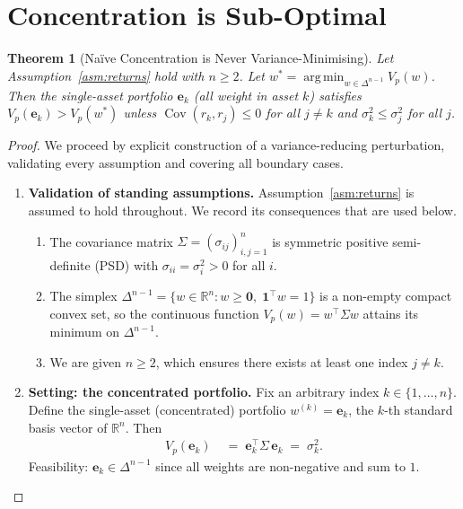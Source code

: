 \documentclass[12pt,openany]{book}
\newcommand{\bfw}{\mathbf{w}}
\newcommand{\bfe}{\mathbf{e}}
\DeclareMathOperator{\Cov}{Cov}
\DeclareMathOperator*{\argmin}{arg\,min}
\numberwithin{equation}{chapter}
\theoremstyle{plain}
\newtheorem{theorem}{Theorem}[chapter]
\theoremstyle{definition}
\theoremstyle{remark}
\def\bfw{w}%
\begin{document}
\section{Concentration is Sub-Optimal}

\begin{theorem}[Na\"{i}ve Concentration is Never Variance-Minimising]
\label{thm:naive-concentration}
Let Assumption~\ref{asm:returns} hold with $n \geq 2$.
Let $\bfw^* = \argmin_{\bfw \in \Delta^{n-1}} V_p(\bfw)$.
Then the single-asset portfolio $\bfe_k$ (all weight in asset $k$)
satisfies $V_p(\bfe_k) > V_p(\bfw^*)$ unless
$\Cov(r_k, r_j) \leq 0$ for all $j \neq k$ and
$\sigma_k^2 \leq \sigma_j^2$ for all $j$.
\end{theorem}

\begin{proof}
We proceed by explicit construction of a variance-reducing perturbation,
validating every assumption and covering all boundary cases.

\begin{enumerate}

  \item \textbf{Validation of standing assumptions.}
        Assumption~\ref{asm:returns} is assumed to hold throughout.
        We record its consequences that are used below.
        \begin{enumerate}
          \item The covariance matrix
                $\Sigma = (\sigma_{ij})_{i,j=1}^{n}$ is
                symmetric positive semi-definite (PSD) with
                $\sigma_{ii} = \sigma_i^2 > 0$ for all $i$.
          \item The simplex $\Delta^{n-1}
                = \{\bfw \in \mathbb{R}^n : \bfw \geq \mathbf{0},\;
                \mathbf{1}^\top\bfw = 1\}$ is a non-empty compact
                convex set, so the continuous function
                $V_p(\bfw) = \bfw^\top \Sigma \bfw$ attains its
                minimum on $\Delta^{n-1}$.
          \item We are given $n \geq 2$, which ensures there
                exists at least one index $j \neq k$.
        \end{enumerate}

  \item \textbf{Setting: the concentrated portfolio.}
        Fix an arbitrary index $k \in \{1,\ldots,n\}$.
        Define the single-asset (concentrated) portfolio
        $\bfw^{(k)} = \bfe_k$, the $k$-th standard basis
        vector of $\mathbb{R}^n$.  Then
        \begin{align}
          V_p(\bfe_k)
          &\;=\; \bfe_k^\top \Sigma\, \bfe_k
           \;=\; \sigma_k^2.
          \label{eq:nc-conc-var}
        \end{align}
        Feasibility: $\bfe_k \in \Delta^{n-1}$ since all weights
        are non-negative and sum to $1$.


\end{enumerate}
\end{proof}
\end{document}
